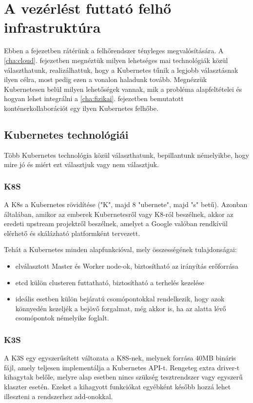 \chapter{A vezérlést futtató felhő infrastruktúra}
\label{cha:kubernetes}

Ebben a fejezetben rátérünk a felhőrendszer tényleges megvalósítására. A \ref{cha:cloud}. fejezetben megnéztük milyen lehetséges mai technológiák közül választhatunk, realizálhattuk, hogy a Kubernetes tűnik a legjobb választásnak ilyen célra, most pedig ezen a vonalon haladunk tovább. Megnézzük Kubernetesen belül milyen lehetőségek vannak, mik a probléma alapfeltételei és hogyan lehet integrálni a \ref{cha:fizikai}. fejezetben bemutatott konténerkollaborációt egy ilyen Kubernetes felhőbe.

\section{Kubernetes technológiái}
Több Kubernetes technológia közül választhatunk, bepillantunk némelyikbe, hogy mire jó és miért ezt választjuk vagy nem választjuk.

\subsection{K8S}

A K8s a Kubernetes rövidítése ("K", majd 8 "ubernete", majd "s" betű). Azonban általában, amikor az emberek Kubernetesről vagy K8-ról beszélnek, akkor az eredeti upstream projektről beszélnek, amelyet a Google valóban rendkívül elérhető és skálázható platformként tervezett.

Tehát a Kubernetes minden alapfunkcióval, mely összességének tulajdonságai:
\begin{itemize}
	\item elválasztott Master és Worker node-ok, biztosítható az irányítás erőforrása
	\item etcd külön clusteren futtatható, biztosítható a terhelés kezelése
	\item ideális esetben külön bejáratú csomópontokkal rendelkezik, hogy azok könnyedén kezeljék a bejövő forgalmat, még akkor is, ha az alatta lévő csomópontok némelyike foglalt. \cite{k8svsk3s}
\end{itemize}
\subsection{K3S}
A K3S egy egyszerűsített változata a K8S-nek, melynek forrása 40MB bináris fájl, amely teljesen implementálja a Kubernetes API-t. Rengeteg extra driver-t kihagytak belőle, melyre alap esetben nincs szükség tesztrendszer vagy egyszerű klaszter esetén. Ezeket a kihagyott funkciókat egyébként később hozzá lehet illeszteni a rendszerhez add-onokkal. \cite{k8svsk3s}
